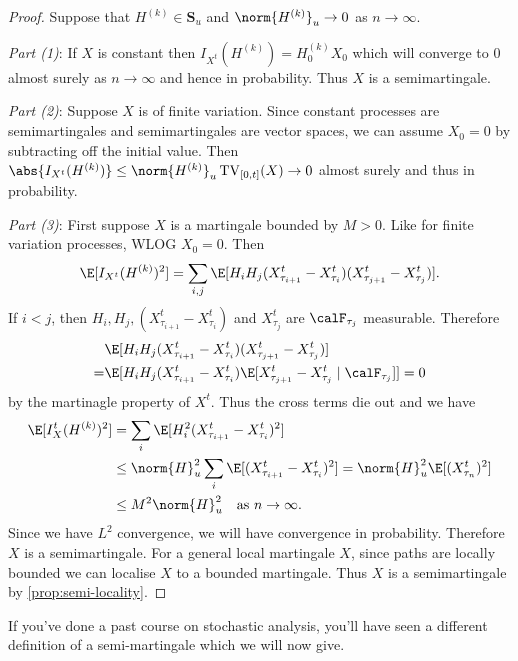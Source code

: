 \documentclass{scrreprt}
\theoremstyle{mydefn}
\theoremstyle{remark}
\newcommand{\simpro}{\mathbf S}
\DeclareMathOperator{\TV}{TV}
\begin{document}
\begin{proof}
	Suppose that $H^{(k)} \in \simpro_u$ and $\norm{H^{(k)}}_u \to 0$ as $n \to \infty$.

	\emph{Part (1)}: If $X$ is constant then $I_{X^t}(H^{(k)}) = H_0^{(k)} X_0$ which will converge to 0 almost surely as $n \to \infty$ and hence in probability. Thus $X$ is a semimartingale.

	\emph{Part (2)}: Suppose $X$ is of finite variation. Since constant processes are semimartingales and semimartingales are vector spaces, we can assume $X_0 = 0$ by subtracting off the initial value. Then $\abs{I_{X^t}(H^{(k)})} \leq \norm{H^{(k)}}_u \TV_{[0,t]}(X) \to 0$ almost surely and thus in probability.

	\emph{Part (3)}: First suppose $X$ is a martingale bounded by $M > 0$. Like for finite variation processes, WLOG $X_0 = 0$. Then
	\begin{equation}
		\E[ I_{X^t}(H^{(k)})^2 ]
		= \sum_{i, j} \E[H_i H_j (X^t_{\tau_{i+1}} - X^t_{\tau_i})(X^t_{\tau_{j+1}} - X^t_{\tau_j})].
	\end{equation}
	If $i < j$, then $H_i, H_j, (X^t_{\tau_{i+1}} - X^t_{\tau_i})$ and $X^t_{\tau_j}$ are $\calF_{\tau_j}$ measurable. Therefore
	\begin{align}
		&\E[H_i H_j (X^t_{\tau_{i+1}} - X^t_{\tau_i})(X^t_{\tau_{j+1}} - X^t_{\tau_j})] \nonumber \\
		=& \E[H_i H_j (X^t_{\tau_{i+1}} - X^t_{\tau_i})\E[X^t_{\tau_{j+1}} - X^t_{\tau_j} \mid \calF_{\tau_j}]]
		= 0
	\end{align}
	by the martinagle property of $X^t$. Thus the cross terms die out and we have
	\begin{align}
		\E[ I_X^t(H^{(k)})^2 ]
		&= \sum_{i} \E[H_i^2 (X^t_{\tau_{i+1}} - X^t_{\tau_i})^2] \\
		&\leq \norm{H}_u^2 \sum_i \E[(X^t_{\tau_{i+1}} - X^t_{\tau_i})^2] 
		= \norm{H}_u^2 \E[(X^t_{\tau_n})^2]  \\
		&\leq M^2 \norm{H}_u^2 \quad \text{as $n \to \infty$}.
	\end{align}
	Since we have $L^2$ convergence, we will have convergence in probability. Therefore $X$ is a semimartingale. For a general \cadlag{} local martingale $X$, since \cadlag{} paths are locally bounded we can localise $X$ to a bounded martingale. Thus $X$ is a semimartingale by \vref{prop:semi-locality}.
\end{proof}

If you've done a past course on stochastic analysis, you'll have seen a different definition of a semi-martingale which we will now give.
\end{document}
